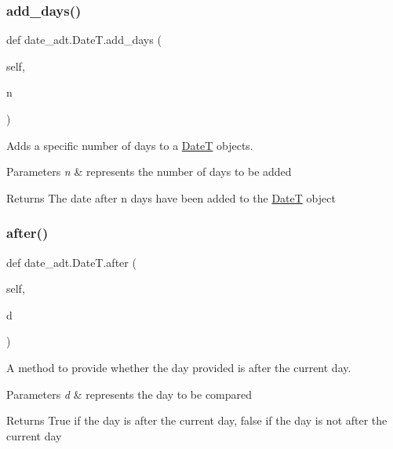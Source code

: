\subsubsection{\texorpdfstring{add\+\_\+days()}{add\_days()}}
{\footnotesize\ttfamily def date\+\_\+adt.\+Date\+T.\+add\+\_\+days (\begin{DoxyParamCaption}\item[{}]{self,  }\item[{}]{n }\end{DoxyParamCaption})}



Adds a specific number of days to a \hyperlink{classdate__adt_1_1_date_t}{DateT} objects. 


\begin{DoxyParams}{Parameters}
{\em n} & represents the number of days to be added \\
\hline
\end{DoxyParams}
\begin{DoxyReturn}{Returns}
The date after n days have been added to the \hyperlink{classdate__adt_1_1_date_t}{DateT} object 
\end{DoxyReturn}
\mbox{\label{classdate__adt_1_1_date_t_a5e8f8b28cc78a795ce6a279dcbc9dbe1}} 
\subsubsection{\texorpdfstring{after()}{after()}}
{\footnotesize\ttfamily def date\+\_\+adt.\+Date\+T.\+after (\begin{DoxyParamCaption}\item[{}]{self,  }\item[{}]{d }\end{DoxyParamCaption})}



A method to provide whether the day provided is after the current day. 


\begin{DoxyParams}{Parameters}
{\em d} & represents the day to be compared \\
\hline
\end{DoxyParams}
\begin{DoxyReturn}{Returns}
True if the day is after the current day, false if the day is not after the current day 
\end{DoxyReturn}
\mbox{\label{classdate__adt_1_1_date_t_a9c7f4d560a968d5c5e811166eb1dcf55}} 
